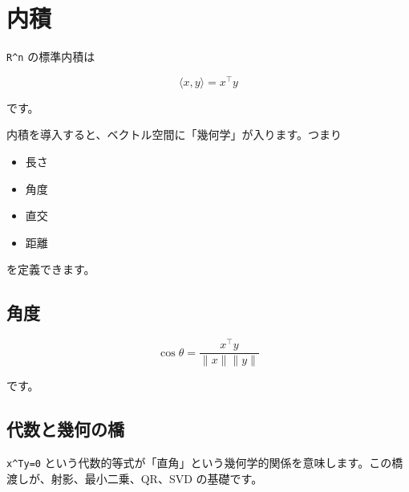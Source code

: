 \documentclass[
  11pt,
  a4paper,
]{ltjsarticle}
\author{}
\date{}
\providecommand{\tightlist}{%
  \setlength{\itemsep}{0pt}\setlength{\parskip}{0pt}}
\begin{document}
\hypertarget{ux5185ux7a4d}{%
\section{内積}\label{ux5185ux7a4d}}

\texttt{R\^{}n} の標準内積は

\[
\langle x,y\rangle=x^\top y
\]

です。

内積を導入すると、ベクトル空間に「幾何学」が入ります。つまり

\begin{itemize}
\tightlist
\item
  長さ
\item
  角度
\item
  直交
\item
  距離
\end{itemize}

を定義できます。

\hypertarget{ux89d2ux5ea6}{%
\subsection{角度}\label{ux89d2ux5ea6}}

\[
\cos\theta=\frac{x^\top y}{\|x\|\|y\|}
\]

です。

\hypertarget{ux4ee3ux6570ux3068ux5e7eux4f55ux306eux6a4b}{%
\subsection{代数と幾何の橋}\label{ux4ee3ux6570ux3068ux5e7eux4f55ux306eux6a4b}}

\texttt{x\^{}Ty=0}
という代数的等式が「直角」という幾何学的関係を意味します。この橋渡しが、射影、最小二乗、QR、SVD
の基礎です。
\end{document}
